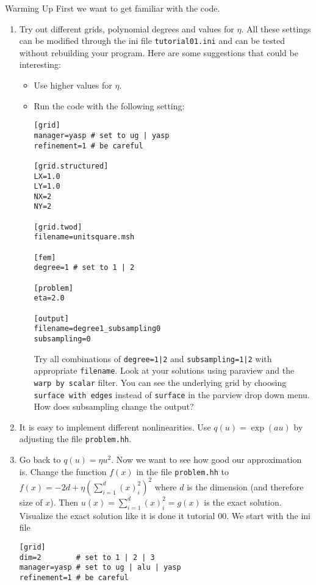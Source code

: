 \documentclass[12pt,a4paper]{article}
\begin{document}
\begin{Exercise}{Warming Up}
  First we want to get familiar with the code.
  \begin{enumerate}
  \item Try out different grids, polynomial degrees and values for
    $\eta$.  All these settings can be modified through the ini file
    \lstinline{tutorial01.ini} and can be tested without
    rebuilding your program.  Here are some suggestions that could be
    interesting:
    \begin{itemize}
    \item Use higher values for $\eta$.

    \item Run the code with the following setting:
      \begin{lstlisting}
[grid]
manager=yasp # set to ug | yasp
refinement=1 # be careful

[grid.structured]
LX=1.0
LY=1.0
NX=2
NY=2

[grid.twod]
filename=unitsquare.msh

[fem]
degree=1 # set to 1 | 2

[problem]
eta=2.0

[output]
filename=degree1_subsampling0
subsampling=0
      \end{lstlisting}
      Try all combinations of \lstinline{degree=1|2} and
      \lstinline{subsampling=1|2} with appropriate
      \lstinline{filename}.  Look at your solutions using paraview and
      the \lstinline{warp by scalar} filter.  You can see the
      underlying grid by choosing \lstinline{surface with edges}
      instead of \lstinline{surface} in the parview drop down menu.
      How does subsampling change the output?
    \end{itemize}

  \item It is easy to implement different nonlinearities.  Use
    $q(u)=\exp(au)$ by adjusting the file \lstinline{problem.hh}.

  \item Go back to $q(u)=\eta u^2$.  Now we want to see how good our
    approximation is.  Change the function $f(x)$ in the file
    \lstinline{problem.hh} to $f(x)=-2d+\eta(\sum_{i=1}^d(x)_i^2)^2$
    where $d$ is the dimension (and therefore size of $x$).  Then
    $u(x)=\sum_{i=1}^d(x)_i^2=g(x)$ is the exact solution.  Visualize the
    exact solution like it is done it tutorial 00. We start with the
    ini file
    \begin{lstlisting}
[grid]
dim=2        # set to 1 | 2 | 3
manager=yasp # set to ug | alu | yasp
refinement=1 # be careful


\end{lstlisting}
\end{enumerate}
\end{Exercise}
\end{document}
